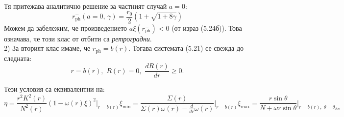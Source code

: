 	\begin{minipage}{20em}
		Тя притежава аналитично решение за частният случай $a = 0$:
		\begin{equation}
			r^-_\text{ph}(a = 0,\,\gamma) = \frac{r_0}{2}\left(1 + \sqrt{1 + 8\gamma}\right)
		\end{equation}
		Можем да забележим, че произведението $a\xi(r_{\text{ph}}^-)<0$ (от израз (5.24б)). Това означава, че този клас от отбити са \emph{ретроградни}.\\
		
		2) За вторият клас имаме, че $r_{\text{ph}} = b(r)$. Тогава системата (5.21) се свежда до следната:
		\begin{equation}
			r = b(r),\,\, R(r) = 0,\,\, \frac{dR(r)}{dr} \ge 0.
		\end{equation}

		Тези условия са еквивалентни на:
		\begin{subequations}
			\begin{equation}
				\eta = \frac{r^2K^2(r)}{N^2(r)}\left(1 - \omega(r)\xi\right)^2\bigg\vert_{r = b(r)}
			\end{equation}
			\begin{equation}
				 \xi_\text{min} = \frac{\Sigma(r)}{\Sigma(r)\omega(r) - \frac{d}{dr}\omega(r)}\bigg\vert_{r = b(r)}
			\end{equation}
			\begin{equation}
				\xi_\text{max} = \frac{r\sin\theta}{N + \omega r \sin\theta}\bigg\vert_{r = b(r),\,\,\theta = \theta_{\text{obs}}}
			\end{equation}
		\end{subequations}

	\end{minipage}\\\newline

